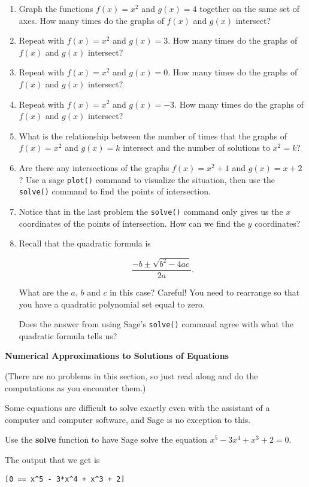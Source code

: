 \begin{enumerate}
	\item Graph the functions $f(x)=x^2$ and $g(x)=4$ together
		on the same set of axes. How many times do the
		graphs of $f(x)$ and $g(x)$ intersect?
	\item Repeat with $f(x)=x^2$ and $g(x)=3$. How many times do the
		graphs of $f(x)$ and $g(x)$ intersect?
	\item Repeat with $f(x)=x^2$ and $g(x)=0$. How many times do the
		graphs of $f(x)$ and $g(x)$ intersect?
	\item Repeat with $f(x)=x^2$ and $g(x)=-3$. How many times do the
		graphs of $f(x)$ and $g(x)$ intersect?
	\item What is the relationship between the number of times
		that the graphs of $f(x)=x^2$ and $g(x)=k$ intersect and the
		number of solutions to $x^2=k$?
	\item Are there any intersections of the graphs $f(x) = x^2 + 1$ and $g(x) = x+2$ ? \newline
	Use a sage \verb+plot()+ command to visualize the situation, then use the \verb+solve()+ command to find the points of intersection. 
	\item Notice that in the last problem the \verb+solve()+ command only gives us the $x$ coordinates of the points of intersection.  How can we find the $y$ coordinates?
    \item Recall that the quadratic formula is 

    \[  \frac{-b \pm \sqrt{b^2 - 4ac}}{2a}. \]

    What are the $a$, $b$ and $c$ in this case?  Careful! You need to rearrange so that you have a quadratic polynomial set equal to zero.

    Does the answer from using Sage's \verb+solve()+ command agree with what the quadratic formula tells us?
\end{enumerate}

{\bf \large Numerical Approximations to Solutions of Equations}

(There are no problems in this section, so just read along and do the computations as you encounter them.)

Some equations are difficult to solve exactly even with the
assistant of a computer and computer software, and Sage is no
exception to this. 

Use the \textbf{solve} function to have Sage solve the
equation $x^5-3x^4+x^3+2=0$. 

The output that we get is
\begin{verbatim}
[0 == x^5 - 3*x^4 + x^3 + 2]
\end{verbatim}

